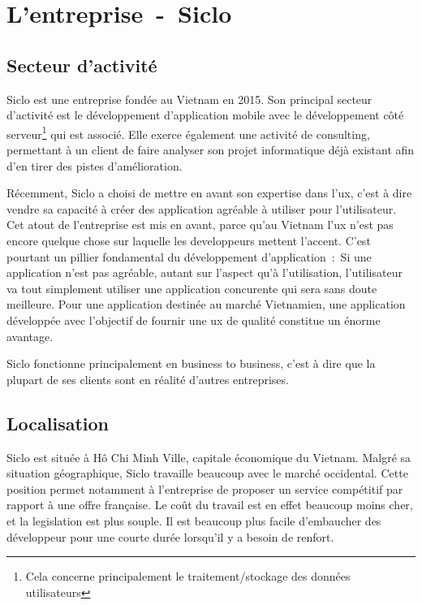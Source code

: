 \documentclass[rapport.tex]{subfiles}
\newcommand{\hcmc}{Hô Chi Minh Ville}
\begin{document}
    \chapter{L'entreprise~-~Siclo}
        \section{Secteur d'activité}
        Siclo est une entreprise fondée au Vietnam en 2015.
        Son principal secteur d'activité est le développement d'application
        mobile avec le développement côté serveur\footnote{Cela concerne
        principalement le traitement/stockage des données utilisateurs} qui est
        associé. Elle exerce également une activité de consulting, permettant
        à un client de faire analyser son projet informatique déjà existant afin
        d'en tirer des pistes d'amélioration.

        Récemment, Siclo a choisi de mettre en avant son expertise dans l'\gls{ux}, c'est 
        à dire vendre sa capacité à créer des application agréable à utiliser pour l'utilisateur.
        Cet atout de l'entreprise est mis en avant, parce qu'au Vietnam l'\gls{ux} n'est pas encore 
        quelque chose sur laquelle les developpeurs mettent l'accent. C'est pourtant un pillier fondamental
        du développement d'application~:~Si une application n'est pas agréable, autant sur l'aspect qu'à 
        l'utilisation, l'utilisateur va tout simplement utiliser une application concurente qui sera sans doute
        meilleure. Pour une application destinée au marché Vietnamien, une application développée avec 
        l'objectif de fournir une \gls{ux} de qualité constitue un énorme avantage.

        Siclo fonctionne principalement en business to business, c'est à
        dire que la plupart de ses clients sont en réalité d'autres
        entreprises.

        \section{Localisation}
        Siclo est située à \hcmc, capitale économique du Vietnam.
        Malgré sa situation géographique, Siclo travaille beaucoup
        avec le marché occidental. Cette position permet notamment à l'entreprise de proposer
        un service compétitif par rapport à une offre française. Le coût du travail
        est en effet beaucoup moins cher, et la legislation est plus souple. Il est beaucoup plus
        facile d'embaucher des développeur pour une courte durée lorsqu'il y a besoin de renfort.
\end{document}
